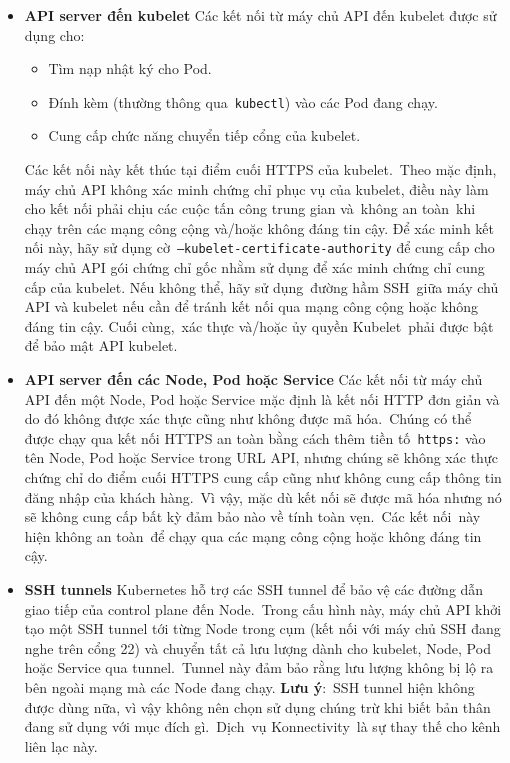 \documentclass[12pt,a4paper]{report}
\begin{document}
	\begin{itemize}
		\item \textbf{API server đến kubelet}
		\smallskip
		\subitem Các kết nối từ máy chủ API đến kubelet được sử dụng cho:
		\begin{itemize}
			\item Tìm nạp nhật ký cho Pod.
			\item Đính kèm (thường thông qua \texttt{kubectl}) vào các Pod đang chạy.
			\item Cung cấp chức năng chuyển tiếp cổng của kubelet.
		\end{itemize}
		\subitem Các kết nối này kết thúc tại điểm cuối HTTPS của kubelet. Theo mặc định, máy chủ API không xác minh chứng chỉ phục vụ của kubelet, điều này làm cho kết nối phải chịu các cuộc tấn công trung gian và không an toàn khi chạy trên các mạng công cộng và/hoặc không đáng tin cậy.
		\smallskip
		\subitem Để xác minh kết nối này, hãy sử dụng cờ \texttt{--kubelet-certificate-authority} để cung cấp cho máy chủ API gói chứng chỉ gốc nhằm sử dụng để xác minh chứng chỉ cung cấp của kubelet.
		\smallskip
		\subitem Nếu không thể, hãy sử dụng đường hầm SSH giữa máy chủ API và kubelet nếu cần để tránh kết nối qua mạng công cộng hoặc không đáng tin cậy.
		\smallskip
		\subitem Cuối cùng, xác thực và/hoặc ủy quyền Kubelet phải được bật để bảo mật API kubelet.
		
		\item \textbf{API server đến các Node, Pod hoặc Service}
		\smallskip
		\subitem Các kết nối từ máy chủ API đến một Node, Pod hoặc Service mặc định là kết nối HTTP đơn giản và do đó không được xác thực cũng như không được mã hóa. Chúng có thể được chạy qua kết nối HTTPS an toàn bằng cách thêm tiền tố \texttt{https:} vào tên Node, Pod hoặc Service trong URL API, nhưng chúng sẽ không xác thực chứng chỉ do điểm cuối HTTPS cung cấp cũng như không cung cấp thông tin đăng nhập của khách hàng. Vì vậy, mặc dù kết nối sẽ được mã hóa nhưng nó sẽ không cung cấp bất kỳ đảm bảo nào về tính toàn vẹn. Các kết nối này hiện không an toàn để chạy qua các mạng công cộng hoặc không đáng tin cậy.
		
		\item \textbf{SSH tunnels}
		\smallskip
		\subitem Kubernetes hỗ trợ các SSH tunnel để bảo vệ các đường dẫn giao tiếp của control plane đến Node. Trong cấu hình này, máy chủ API khởi tạo một SSH tunnel tới từng Node trong cụm (kết nối với máy chủ SSH đang nghe trên cổng 22) và chuyển tất cả lưu lượng dành cho kubelet, Node, Pod hoặc Service qua tunnel. Tunnel này đảm bảo rằng lưu lượng không bị lộ ra bên ngoài mạng mà các Node đang chạy.
		\smallskip
		\subitem \textbf{Lưu ý}: SSH tunnel hiện không được dùng nữa, vì vậy không nên chọn sử dụng chúng trừ khi biết bản thân đang sử dụng với mục đích gì. Dịch vụ Konnectivity là sự thay thế cho kênh liên lạc này.
		

\end{itemize}
\end{document}
